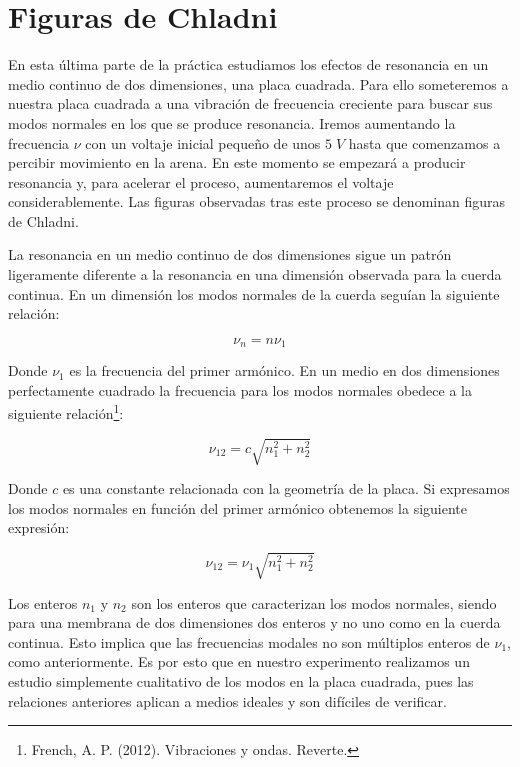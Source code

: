 \documentclass[a4paper,12pt,titlepage]{article}
\begin{document}
\section{Figuras de Chladni}

En esta última parte de la práctica estudiamos los efectos de resonancia en un medio continuo de dos dimensiones, una placa cuadrada. Para ello someteremos a nuestra placa cuadrada a una vibración de frecuencia creciente para buscar sus modos normales en los que se produce resonancia. Iremos aumentando la frecuencia $\nu$ con un voltaje inicial pequeño de unos $5\;V$ hasta que comenzamos a percibir movimiento en la arena. En este momento se empezará a producir resonancia y, para acelerar el proceso, aumentaremos el voltaje considerablemente. Las figuras observadas tras este proceso se denominan figuras de Chladni.

\par La resonancia en un medio continuo de dos dimensiones sigue un patrón ligeramente diferente a la resonancia en una dimensión observada para la cuerda continua. En un dimensión los modos normales de la cuerda seguían la siguiente relación:

\begin{equation}
    \nu_n = n\nu_1
\end{equation}

Donde $\nu_1$ es la frecuencia del primer armónico. En un medio en dos dimensiones perfectamente cuadrado la frecuencia para los modos normales obedece a la siguiente relación\footnote{French, A. P. (2012). Vibraciones y ondas. Reverte.}:

\begin{equation}
    \nu_{12} =c \sqrt{n_1^2+n_2^2} 
\end{equation}

Donde $c$ es una constante relacionada con la geometría de la placa. Si expresamos los modos normales en función del primer armónico obtenemos la siguiente expresión:

\begin{equation}
    \nu_{12} = \nu_1 \sqrt{n_1^2+n_2^2}
\end{equation}

Los enteros $n_1$ y $n_2$ son los enteros que caracterizan los modos normales, siendo para una membrana de dos dimensiones dos enteros y no uno como en la cuerda continua. Esto implica que las frecuencias modales no son múltiplos enteros de $\nu_1$, como anteriormente. Es por esto que en nuestro experimento realizamos un estudio simplemente cualitativo de los modos en la placa cuadrada, pues las relaciones anteriores aplican a medios ideales y son difíciles de verificar.
\end{document}
